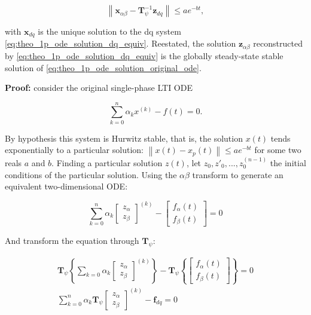 \begin{theorem}
\begin{equation} \left\lVert \mathbf{x}_{\alpha\beta} - \mathbf{T}^{-1}_\psi\mathbf{z}_{dq}\right\rVert \leq ae^{-bt}, \label{eq:theo_1p_ode_solution_exp}\end{equation}

	\noindent with $\mathbf{x}_{dq}$ is the unique solution to the dq system \eqref{eq:theo_1p_ode_solution_dq_equiv}. Reestated, the solution $\mathbf{z}_{\alpha\beta}$ reconstructed by \eqref{eq:theo_1p_ode_solution_dq_equiv} is the globally steady-state stable solution of \eqref{eq:theo_1p_ode_solution_original_ode}.

\end{theorem}
\textbf{Proof:} consider the original single-phase LTI ODE

\begin{equation} \sum\limits_{k=0}^n \alpha_k x^{\left(k\right)} - f(t) = 0.\end{equation}

	By hypothesis this system is Hurwitz stable, that is, the solution $x(t)$ tends exponentially to a particular solution: $\left\lVert x(t) - x_p(t)\right\rVert \leq ae^{-bt}$ for some two reals $a$ and $b$. Finding a particular solution $z(t)$, let $z_0,z'_0,...,z^{(n-1)}_0$ the initial conditions of the particular solution. Using the $\alpha\beta$ transform to generate an equivalent two-dimensional ODE:

\begin{equation} \sum\limits_{k=0}^n \alpha_k \left[\begin{array}{c} z_\alpha \\ z_\beta \end{array}\right]^{\left(k\right)} - \left[\begin{array}{c} f_\alpha(t)\\ f_\beta(t) \end{array}\right] = 0\end{equation}

	And transform the equation through $\mathbf{T}_\psi$:

\begin{gather}
	\mathbf{T}_\psi\left\{\sum\limits_{k=0} \alpha_k \left[\begin{array}{c} z_\alpha \\ z_\beta  \end{array}\right]^{\left(k\right)}\right\} - \mathbf{T}_\psi\left\{\left[\begin{array}{c} f_\alpha(t) \\ f_\beta(t) \end{array}\right]\right\} = 0 \\[5mm]
%
	\sum\limits_{k=0}^n \alpha_k \mathbf{T}_\psi\left[\begin{array}{c} z_\alpha \\ z_\beta \end{array}\right]^{\left(k\right)} - \mathbf{f}_{dq} = 0
\end{gather}

